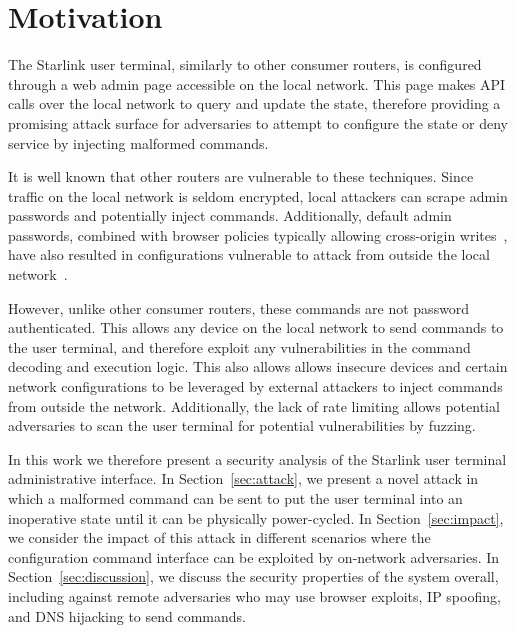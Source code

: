 \section{Motivation}\label{sec:motivation}

The Starlink user terminal, similarly to other consumer routers, is configured through a web admin page accessible on the local network.
This page makes API calls over the local network to query and update the state, therefore providing a promising attack surface for adversaries to attempt to configure the state or deny service by injecting malformed commands.

It is well known that other routers are vulnerable to these techniques.
Since traffic on the local network is seldom encrypted, local attackers can scrape admin passwords and potentially inject commands.
Additionally, default admin passwords, combined with browser policies typically allowing cross-origin writes~\cite{same_origin_policy,csrf_internal_network}, have also resulted in configurations vulnerable to attack from outside the local network~\cite{drive_by_pharming}.

However, unlike other consumer routers, these commands are not password authenticated.
This allows any device on the local network to send commands to the user terminal, and therefore exploit any vulnerabilities in the command decoding and execution logic.
This also allows allows insecure devices and certain network configurations to be leveraged by external attackers to inject commands from outside the network.
Additionally, the lack of rate limiting allows potential adversaries to scan the user terminal for potential vulnerabilities by fuzzing.

In this work we therefore present a security analysis of the Starlink user terminal administrative interface.
In Section~\ref{sec:attack}, we present a novel attack in which a malformed command can be sent to put the user terminal into an inoperative state until it can be physically power-cycled.
In Section~\ref{sec:impact}, we consider the impact of this attack in different scenarios where the configuration command interface can be exploited by on-network adversaries.
In Section~\ref{sec:discussion}, we discuss the security properties of the system overall, including against remote adversaries who may use browser exploits, IP spoofing, and DNS hijacking to send commands.
